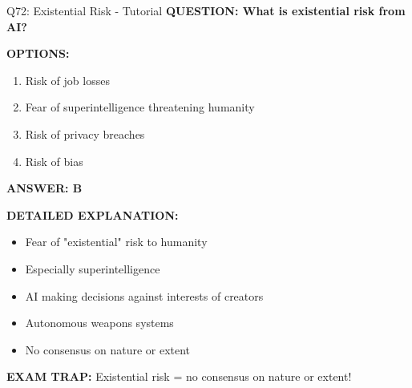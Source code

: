 \documentclass[8pt]{beamer}
\begin{document}
	\begin{frame}{Q72: Existential Risk - Tutorial}
		\fontsize{6.5}{7.5}\selectfont
		\textbf{QUESTION: What is existential risk from AI?}
		
		\vspace{0.1cm}
		\textbf{OPTIONS:}
		\begin{enumerate}
			\item Risk of job losses
			\item Fear of superintelligence threatening humanity
			\item Risk of privacy breaches
			\item Risk of bias
		\end{enumerate}
		
		\vspace{0.1cm}
		\textcolor{myblue}{\textbf{ANSWER: B}}
		
		\vspace{0.1cm}
		\textbf{DETAILED EXPLANATION:}
		\begin{itemize}
			\item Fear of "existential" risk to humanity
			\item Especially superintelligence
			\item AI making decisions against interests of creators
			\item Autonomous weapons systems
			\item No consensus on nature or extent
		\end{itemize}
		
		\vspace{0.1cm}
		\textcolor{myred}{\textbf{EXAM TRAP:}} Existential risk = \textcolor{myblue}{no consensus on nature or extent}!
	\end{frame}
	
\end{document}
